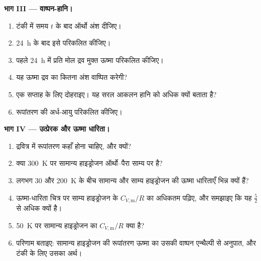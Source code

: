 \begin{problem}
\medskip\noindent\textbf{भाग III --- वाष्पन-हानि।}
\begin{enumerate}[resume]
  \item टंकी में समय $t$ के बाद ऑर्थो अंश दीजिए।
  \item \qty{24}{h} के बाद इसे परिकलित कीजिए।
  \item पहले \qty{24}{h} में प्रति मोल द्रव मुक्त ऊष्मा परिकलित कीजिए।
  \item यह ऊष्मा द्रव का कितना अंश वाष्पित करेगी?
  \item एक सप्ताह के लिए दोहराइए। यह सरल आकलन हानि को अधिक क्यों बताता है?
  \item रूपांतरण की अर्ध-आयु परिकलित कीजिए।
\end{enumerate}

\medskip\noindent\textbf{भाग IV --- उत्प्रेरक और ऊष्मा धारिता।}
\begin{enumerate}[resume]
  \item द्रवित्र में रूपांतरण कहाँ होना चाहिए, और क्यों?
  \item क्या \qty{300}{K} पर सामान्य हाइड्रोजन ऑर्थो--पैरा साम्य पर है?
  \item लगभग 30 और \qty{200}{K} के बीच सामान्य और साम्य हाइड्रोजन की ऊष्मा धारिताएँ
        भिन्न क्यों हैं?
  \item ऊष्मा-धारिता चित्र पर साम्य हाइड्रोजन के $C_{V,\mathrm m}/R$ का अधिकतम पढ़िए,
        और समझाइए कि यह $\frac52$ से अधिक क्यों है।
  \item \qty{50}{K} पर सामान्य हाइड्रोजन का $C_{V,\mathrm m}/R$ क्या है?
  \item परिणाम बताइए: सामान्य हाइड्रोजन की रूपांतरण ऊष्मा का
        उसकी वाष्पन एन्थैल्पी से अनुपात, और टंकी के लिए उसका अर्थ।
\end{enumerate}
\end{problem}
